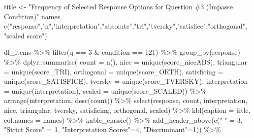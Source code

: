 \documentclass[
  letterpaper,
  DIV=11,
  numbers=noendperiod]{scrreprt}
\newenvironment{Shaded}{\begin{snugshade}}{\end{snugshade}}
\newcommand{\AttributeTok}[1]{\textcolor[rgb]{0.40,0.45,0.13}{#1}}
\newcommand{\DecValTok}[1]{\textcolor[rgb]{0.68,0.00,0.00}{#1}}
\newcommand{\FunctionTok}[1]{\textcolor[rgb]{0.28,0.35,0.67}{#1}}
\newcommand{\NormalTok}[1]{\textcolor[rgb]{0.00,0.23,0.31}{#1}}
\newcommand{\OtherTok}[1]{\textcolor[rgb]{0.00,0.23,0.31}{#1}}
\newcommand{\SpecialCharTok}[1]{\textcolor[rgb]{0.37,0.37,0.37}{#1}}
\newcommand{\StringTok}[1]{\textcolor[rgb]{0.13,0.47,0.30}{#1}}
\begin{document}
\begin{Shaded}
\begin{Highlighting}[]
\NormalTok{title }\OtherTok{\textless{}{-}} \StringTok{"Frequency of Selected Response Options for Question \#3 (Impasse Condition)"}
\NormalTok{names }\OtherTok{=} \FunctionTok{c}\NormalTok{(}\StringTok{"response"}\NormalTok{,}\StringTok{"n"}\NormalTok{,}\StringTok{"interpretation"}\NormalTok{,}\StringTok{"absolute"}\NormalTok{,}\StringTok{"tri"}\NormalTok{,}\StringTok{"tversky"}\NormalTok{,}\StringTok{"satisfice"}\NormalTok{,}\StringTok{"orthogonal"}\NormalTok{, }\StringTok{"scaled score"}\NormalTok{)}

\NormalTok{df\_items }\SpecialCharTok{\%\textgreater{}\%} \FunctionTok{filter}\NormalTok{(q }\SpecialCharTok{==} \DecValTok{3} \SpecialCharTok{\&}\NormalTok{ condition }\SpecialCharTok{==} \DecValTok{121}\NormalTok{) }\SpecialCharTok{\%\textgreater{}\%} \FunctionTok{group\_by}\NormalTok{(response) }\SpecialCharTok{\%\textgreater{}\%} 
\NormalTok{  dplyr}\SpecialCharTok{::}\FunctionTok{summarise}\NormalTok{( }\AttributeTok{count =} \FunctionTok{n}\NormalTok{(), }
                    \AttributeTok{nice =} \FunctionTok{unique}\NormalTok{(score\_niceABS),}
                    \AttributeTok{triangular =} \FunctionTok{unique}\NormalTok{(score\_TRI), }
                    \AttributeTok{orthogonal =}  \FunctionTok{unique}\NormalTok{(score\_ORTH),}
                    \AttributeTok{satisficing =}  \FunctionTok{unique}\NormalTok{(score\_SATISFICE),}
                    \AttributeTok{tversky =} \FunctionTok{unique}\NormalTok{(score\_TVERSKY),}
                    \AttributeTok{interpretation =} \FunctionTok{unique}\NormalTok{(interpretation),}
                    \AttributeTok{scaled =} \FunctionTok{unique}\NormalTok{(score\_SCALED)) }\SpecialCharTok{\%\textgreater{}\%} 
  \FunctionTok{arrange}\NormalTok{(interpretation, }\FunctionTok{desc}\NormalTok{(count)) }\SpecialCharTok{\%\textgreater{}\%} 
  \FunctionTok{select}\NormalTok{(response, count, interpretation, nice, }
\NormalTok{         triangular, tversky, satisficing, orthogonal, scaled) }\SpecialCharTok{\%\textgreater{}\%} 
  \FunctionTok{kbl}\NormalTok{(}\AttributeTok{caption =}\NormalTok{ title, }\AttributeTok{col.names =}\NormalTok{ names) }\SpecialCharTok{\%\textgreater{}\%}  \FunctionTok{kable\_classic}\NormalTok{() }\SpecialCharTok{\%\textgreater{}\%} 
  \FunctionTok{add\_header\_above}\NormalTok{(}\FunctionTok{c}\NormalTok{(}\StringTok{" "} \OtherTok{=} \DecValTok{3}\NormalTok{, }\StringTok{"Strict Score"} \OtherTok{=} \DecValTok{1}\NormalTok{, }\StringTok{"Interpretation Scores"}\OtherTok{=}\DecValTok{4}\NormalTok{, }\StringTok{"Discriminant"}\OtherTok{=}\DecValTok{1}\NormalTok{)) }\SpecialCharTok{\%\textgreater{}\%}

\end{Highlighting}
\end{Shaded}
\end{document}
